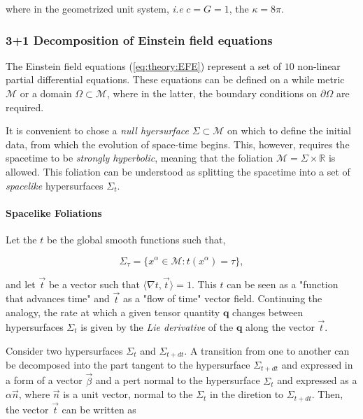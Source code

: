 where in the geometrized unit system, \textit{i.e} $c=G=1$, the $\kappa=8\pi$.

\subsubsection{3+1 Decomposition of Einstein field equations}

The Einstein field equations (\ref{eq:theory:EFE}) represent a set of $10$ non-linear partial differential equations.
These equations can be defined on a while metric $\mathcal{M}$ or a domain $\Omega\subset\mathcal{M}$, where in the latter, the boundary conditions on $\partial\Omega$ are required. 

It is convenient to chose a \textit{null hyersurface} $\Sigma\subset\mathcal{M}$ on which to define the initial data, from which the evolution of space-time begins. 
This, however, requires the spacetime to be \textit{strongly hyperbolic}, meaning that the foliation $\mathcal{M}=\Sigma\times\mathbb{R}$ is allowed. 
This foliation can be understood as splitting the spacetime into a set of \textit{spacelike} hypersurfaces $\Sigma_t$. 


\paragraph{Spacelike Foliations}


Let the $t$ be the global smooth functions such that, 

\begin{equation}
\Sigma_{\tau} = \{x^{\alpha}\in\mathcal{M}: t(x^{\alpha})=\tau\},
\end{equation}

and let $\vec{t}$ be a vector such that $\langle\nabla t, \vec{t}\rangle = 1$. 
This $t$ can be seen as a "function that advances time" and $\vec{t}$ as a "flow of time" vector field.
Continuing the analogy, the rate at which a given tensor quantity $\boldsymbol{q}$ changes between hypersurfaces $\Sigma_t$ is given by the \textit{Lie derivative} of the $\boldsymbol{q}$ along the vector $\vec{t}$.

Consider two hypersurfaces $\Sigma_t$ and $\Sigma_{t+dt}$. 
A transition from one to another can be decomposed into the part tangent to the hypersurface $\Sigma_{t+dt}$ and expressed in a form of a vector $\vec{\beta}$ and a pert normal to the hypersurface $\Sigma_t$ and expressed as a $\alpha \vec{n}$, where $\vec{n}$ is a unit vector, normal to the $\Sigma_t$ in the diretion to $\Sigma_{t+dt}$. 
Then, the vector $\vec{t}$ can be written as 


